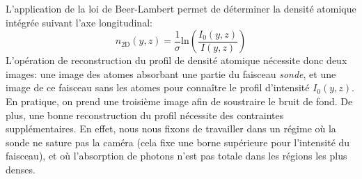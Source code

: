 L'application de la loi de Beer-Lambert permet de déterminer la densité atomique intégrée suivant l'axe longitudinal:
\begin{equation}
n_{\mathrm{2D}}(y,z)= \frac{1}{\sigma} \mathrm{ln}\left( \frac{I_0(y,z)}{I(y,z)} \right)
\end{equation}
L'opération de reconstruction du profil de densité atomique nécessite donc deux images: une image des atomes absorbant une partie du faisceau \emph{sonde}, et une image de ce faisceau sans les atomes pour connaître le profil d'intensité $I_0(y,z)$. En pratique, on prend une troisième image afin de soustraire le bruit de fond. De plus, une bonne reconstruction du profil nécessite des contraintes supplémentaires. En effet, nous nous fixons de travailler dans un régime où la sonde ne sature pas la caméra (cela fixe une borne supérieure pour l'intensité du faisceau), et où l'absorption de photons n'est pas totale dans les régions les plus denses.



